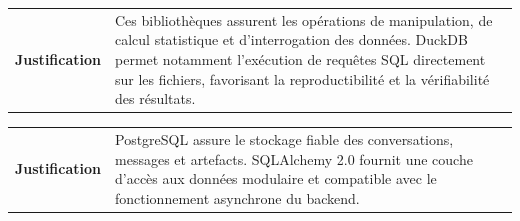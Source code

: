 \vspace{0.15cm}

\noindent
{}
\hspace{0.8cm}
\hspace{0.8cm}

\vspace{0.15cm}

\noindent
\begin{tabularx}{\textwidth}{@{}p{}X@{}}
\textcolor{MidGray}{\textbf{Justification}} &
Ces bibliothèques assurent les opérations de manipulation, de
calcul statistique et d'interrogation des données. DuckDB permet
notamment l'exécution de requêtes SQL directement sur les fichiers,
favorisant la reproductibilité et la vérifiabilité des résultats.
\end{tabularx}

\techseparator



\vspace{0.15cm}

\noindent
{}
\hspace{0.8cm}

\vspace{0.15cm}

\noindent
\begin{tabularx}{\textwidth}{@{}p{}X@{}}
\textcolor{MidGray}{\textbf{Justification}} &
PostgreSQL assure le stockage fiable des conversations, messages
et artefacts. SQLAlchemy 2.0 fournit une couche d'accès aux données
modulaire et compatible avec le fonctionnement asynchrone du backend.
\end{tabularx}

\techseparator



\vspace{0.15cm}

\noindent
{}
\hspace{0.8cm}

